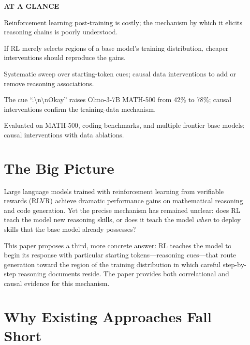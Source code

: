 \documentclass[10pt,twocolumn]{article}
\begin{document}
\begin{mdframed}[backgroundcolor=boxgray,linecolor=rulered,linewidth=1pt,
    innerleftmargin=6pt,innerrightmargin=6pt,
    innertopmargin=6pt,innerbottommargin=6pt]
\textbf{\small AT A GLANCE}\par\vspace{4pt}
\begin{description}[leftmargin=0pt,labelsep=4pt,itemsep=2pt,parsep=0pt,
    font=\small\bfseries]
  \item[Problem:] Reinforcement learning post-training is costly; the mechanism
    by which it elicits reasoning chains is poorly understood.
  \item[Why it matters:] If RL merely selects regions of a base model's training
    distribution, cheaper interventions should reproduce the gains.
  \item[Method:] Systematic sweep over starting-token cues; causal data
    interventions to add or remove reasoning associations.
  \item[Result:] The cue ``.\textbackslash n\textbackslash nOkay'' raises Olmo-3-7B MATH-500 from 42\%
    to 78\%; causal interventions confirm the training-data mechanism.
  \item[Evidence:] Evaluated on MATH-500, coding benchmarks, and multiple
    frontier base models; causal interventions with data ablations.
\end{description}
\end{mdframed}

\section{The Big Picture}

Large language models trained with reinforcement learning from verifiable rewards
(RLVR) achieve dramatic performance gains on mathematical reasoning and code
generation. Yet the precise mechanism has remained unclear: does RL teach the
model new reasoning skills, or does it teach the model \emph{when} to deploy
skills that the base model already possesses?

This paper proposes a third, more concrete answer: RL teaches the model to begin
its response with particular starting tokens---reasoning cues---that route
generation toward the region of the training distribution in which careful
step-by-step reasoning documents reside. The paper provides both correlational
and causal evidence for this mechanism.

\section{Why Existing Approaches Fall Short}
\end{document}

